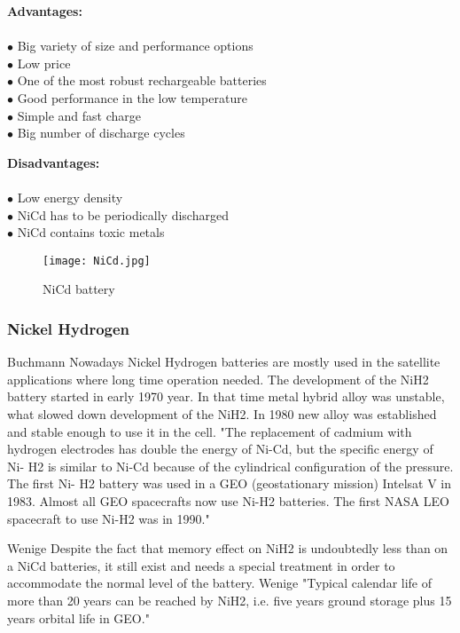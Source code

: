 \begin{multicols}{2}

	\textbf{Advantages:} \\ \\
	$\bullet$ Big variety of size and performance options\\
	$\bullet$ Low price\\
	$\bullet$ One of the most robust rechargeable batteries\\
	$\bullet$ Good performance in the low temperature\\
	$\bullet$ Simple and fast charge\\
	$\bullet$ Big number of discharge cycles\\
	
	
	\columnbreak
	
	\textbf{Disadvantages:} \\ \\
	$\bullet$ Low energy density\\
	$\bullet$ NiCd has to be periodically discharged\\
	$\bullet$ NiCd contains toxic metals\\ 

\end{multicols}

\begin{figure}[h]
	\centering
	\texttt{[image: NiCd.jpg]}
	\caption{NiCd battery\cite{9}}
	\label{fig: EPS}
\end{figure}


\subsubsection{Nickel Hydrogen \label{sec:tech}}
Buchmann\cite{7} Nowadays Nickel Hydrogen batteries are mostly used in the satellite applications where long time operation needed. The development of the NiH2 battery started in early 1970 year. In that time metal hybrid alloy was unstable, what slowed down development of the NiH2. In 1980 new alloy was established and stable enough to use it in the cell. 
\cite{10}"The replacement of cadmium with hydrogen electrodes has double the energy of Ni-Cd, but the specific energy of Ni- H2 is similar to Ni-Cd because of the cylindrical configuration of the pressure. The first Ni- H2 battery was used in a GEO (geostationary mission) Intelsat V in 1983.  Almost all GEO spacecrafts now use Ni-H2 batteries. The first NASA LEO spacecraft to use Ni-H2 was in 1990."


Wenige\cite{8} Despite the fact that memory effect on NiH2 is undoubtedly less than on a NiCd batteries, it still exist and needs a special treatment in order to accommodate the normal level of the battery. Wenige\cite{8} "Typical calendar life of more than 20 years can be reached by NiH2, i.e. five years ground storage plus 15  years  orbital  life  in  GEO." 


